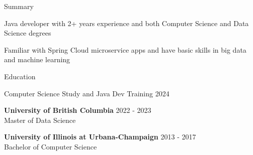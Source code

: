 \documentclass{resume} %
\begin{document}
\begin{skillSection}{Summary}
\item Java developer with 2+ years experience and both Computer Science and Data Science degrees
\item Familiar with Spring Cloud microservice apps and have basic skills in big data and machine learning
\end{skillSection}


\begin{rSection}{Education}

{Computer Science Study and Java Dev Training} \hfill {2024}

{\bf University of British Columbia} \hfill {2022 - 2023}
\\ Master of Data Science

{\bf University of Illinois at Urbana-Champaign} \hfill {2013 - 2017}
\\ Bachelor of Computer Science

\end{rSection}

\end{document}
